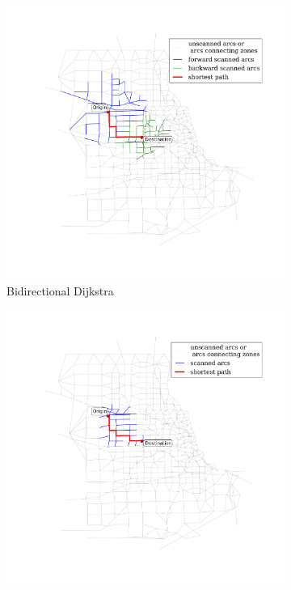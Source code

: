 \begin{figure}[H]
\begin{subfigure}{.5\textwidth}
        \includegraphics[width=\textwidth,trim=120px 120px 48px 120px,clip]{img/chicago_bidirect2}
        \caption{Bidirectional Dijkstra}
        \label{fig:chicago_bidirect2}
    \end{subfigure}
    \begin{subfigure}{.5\textwidth}
        \centering
        \includegraphics[width=\textwidth,trim=120px 120px 48px 0px,clip]{img/chicago_astar2}

\end{subfigure}
\end{figure}

